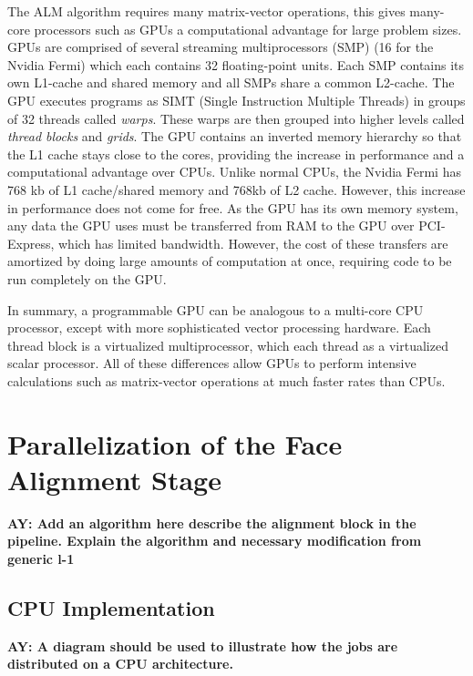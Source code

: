 \documentclass[10pt,twocolumn,letterpaper]{article}
\begin{document}
The ALM algorithm requires many matrix-vector operations, this gives many-core processors such as GPUs a computational advantage for large problem sizes.  GPUs are comprised of several streaming multiprocessors (SMP) (16 for the Nvidia Fermi) which each contains 32 floating-point units.  Each SMP contains its own L1-cache and shared memory and all SMPs share a common L2-cache.  The GPU executes programs as SIMT (Single Instruction Multiple Threads) in groups of 32 threads called \emph{warps}.  These warps are then grouped into higher levels called \emph{thread blocks} and \emph{grids}. The GPU contains an inverted memory hierarchy so that the L1 cache stays close to the cores, providing the increase in performance and a computational advantage over CPUs.  Unlike normal CPUs, the Nvidia Fermi has 768 kb of L1 cache/shared memory and 768kb of L2 cache. However, this increase in performance does not come for free. As the GPU has its own memory system, any data the GPU uses must be transferred from RAM to the GPU over PCI-Express, which has limited bandwidth. However, the cost of these transfers are amortized by doing large amounts of computation at once, requiring code to be run completely on the GPU.  

In summary, a programmable GPU can be analogous to a multi-core CPU processor, except with more sophisticated vector processing hardware.  Each thread block is a virtualized multiprocessor, which each thread as a virtualized scalar processor.  All of these differences allow GPUs to perform intensive calculations such as matrix-vector operations at much faster rates than CPUs. 


\section{Parallelization of the Face Alignment Stage}
\label{sec:alignment}
{\bf AY: Add an algorithm here describe the alignment block in the pipeline. Explain the algorithm and necessary modification from generic l-1}

\subsection{CPU Implementation}

{\bf AY: A diagram should be used to illustrate how the jobs are distributed on a CPU architecture.}
\end{document}
